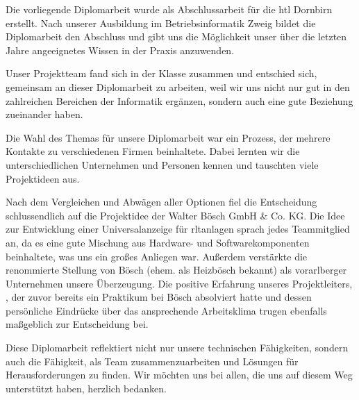 Die vorliegende Diplomarbeit wurde als Abschlussarbeit für die \ac{htl} Dornbirn erstellt. Nach unserer Ausbildung im Betriebsinformatik Zweig bildet die Diplomarbeit den Abschluss und gibt uns die Möglichkeit unser über die letzten Jahre angeeignetes Wissen in der Praxis anzuwenden.

Unser Projektteam fand sich in der Klasse zusammen und entschied sich, gemeinsam an dieser Diplomarbeit zu arbeiten, weil wir uns nicht nur gut in den zahlreichen Bereichen der Informatik ergänzen, sondern auch eine gute Beziehung zueinander haben.

Die Wahl des Themas für unsere Diplomarbeit war ein Prozess, der mehrere Kontakte zu verschiedenen Firmen beinhaltete. Dabei lernten wir die unterschiedlichen Unternehmen und Personen kennen und tauschten viele Projektideen aus.

Nach dem Vergleichen und Abwägen aller Optionen fiel die Entscheidung schlussendlich auf die Projektidee der Walter Bösch GmbH \& Co. KG. Die Idee zur Entwicklung einer Universalanzeige für \acl{rltanlagen} sprach jedes Teammitglied an, da es eine gute Mischung aus Hardware- und Softwarekomponenten beinhaltete, was uns ein großes Anliegen war. Außerdem verstärkte die renommierte Stellung von Bösch (ehem. als Heizbösch bekannt) als vorarlberger Unternehmen unsere Überzeugung. Die positive Erfahrung unseres Projektleiters, \mangeng, der zuvor bereits ein Praktikum bei Bösch absolviert hatte und dessen persönliche Eindrücke über das ansprechende Arbeitsklima trugen ebenfalls maßgeblich zur Entscheidung bei.

Diese Diplomarbeit reflektiert nicht nur unsere technischen Fähigkeiten, sondern auch die Fähigkeit, als Team zusammenzuarbeiten und Lösungen für Herausforderungen zu finden. Wir möchten uns bei allen, die uns auf diesem Weg unterstützt haben, herzlich bedanken.
